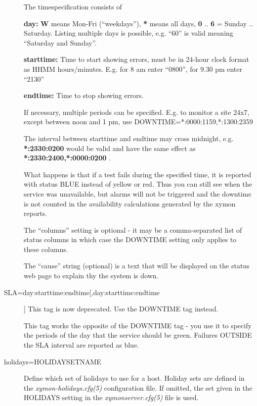 \begin{description}
  The timespecification consists of 


 \textbf{day:}
 \textbf{W}
 means Mon-Fri (``weekdays''), \textbf{*}
 means all days, \textbf{0}
 .. \textbf{6}
 = Sunday .. Saturday. Listing multiple days is possible, e.g. ``60'' is valid meaning ``Saturday and Sunday''. 


 \textbf{starttime:}
 Time to start showing errors, must be in 24-hour clock format as HHMM
 hours/minutes. E.g. for 8 am enter ``0800'', for 9.30 pm enter
 ``2130'' 



 \textbf{endtime:}
 Time to stop showing errors. 


  If necessary, multiple periods can be specified. E.g. to monitor a site 24x7, except between noon and 1 pm, use DOWNTIME=*:0000:1159,*:1300:2359 


  The interval between starttime and endtime may cross midnight, e.g. \textbf{*:2330:0200}
 would be valid and have the same effect as \textbf{*:2330:2400,*:0000:0200}
. 


  What happens is that if a test fails during the specified time, it
  is reported with status BLUE instead of yellow or red. Thus you can
  still see when the service was unavailable, but alarms will not be
  triggered and the downtime is not counted in the availability
  calculations generated by the xymon reports. 



  The ``columns'' setting is optional - it may be a comma-separated list of status columns in which case the DOWNTIME setting only applies to these columns. 


  The ``cause'' string (optional) is a text that will be displayed on the status web page to explain thy the system is down. 


 

\item[SLA=day:starttime:endtime[,day:starttime:endtime]] This tag is now deprecated. Use the DOWNTIME tag instead. 

  This tag works the opposite of the DOWNTIME tag - you use it to
  specify the periods of the day that the service should be
  green. Failures OUTSIDE the SLA interval are reported as blue. 



 

\item[holidays=HOLIDAYSETNAME] Define which set of holidays to use for
  a host. Holiday sets are defined in the
  \emph{xymon-holidays.cfg(5)} configuration file. If omitted, the
  set given in the HOLIDAYS setting in the \emph{xymonserver.cfg(5)}
  file is used. 



\end{description}

